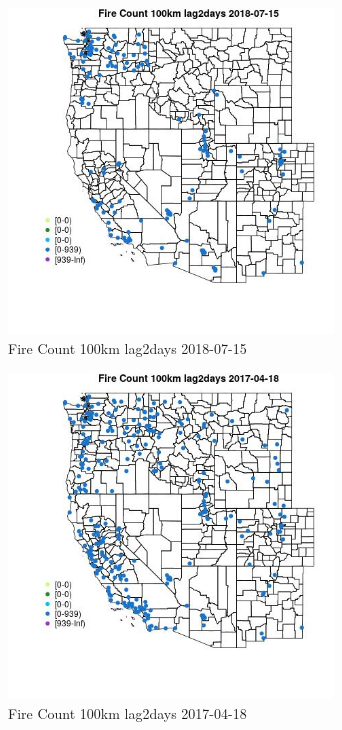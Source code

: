 \begin{figure} 
\centering  
\includegraphics[width=0.77\textwidth]{Code_Outputs/Report_ML_input_PM25_Step4_part_e_de_duplicated_aves_compiled_2019-05-20wNAs_MapObsFire_Count_100km_lag2days2018-07-15.jpg} 
\caption{\label{fig:Report_ML_input_PM25_Step4_part_e_de_duplicated_aves_compiled_2019-05-20wNAsMapObsFire_Count_100km_lag2days2018-07-15}Fire Count 100km lag2days 2018-07-15} 
\end{figure} 
 

\begin{figure} 
\centering  
\includegraphics[width=0.77\textwidth]{Code_Outputs/Report_ML_input_PM25_Step4_part_e_de_duplicated_aves_compiled_2019-05-20wNAs_MapObsFire_Count_100km_lag2days2017-04-18.jpg} 
\caption{\label{fig:Report_ML_input_PM25_Step4_part_e_de_duplicated_aves_compiled_2019-05-20wNAsMapObsFire_Count_100km_lag2days2017-04-18}Fire Count 100km lag2days 2017-04-18} 
\end{figure} 
 

